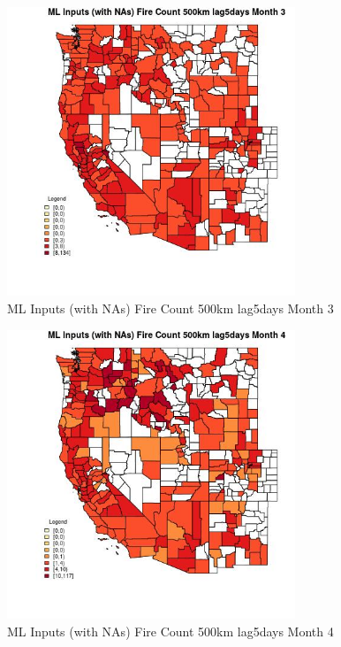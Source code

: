 \begin{figure} 
\centering  
\includegraphics[width=0.77\textwidth]{Code_Outputs/Report_ML_input_PM25_Step4_part_e_de_duplicated_aves_compiled_2019-05-21wNAs_CountyFire_Count_500km_lag5daysmedianMonth3.jpg} 
\caption{\label{fig:Report_ML_input_PM25_Step4_part_e_de_duplicated_aves_compiled_2019-05-21wNAsCountyFire_Count_500km_lag5daysmedianMonth3}ML Inputs (with NAs) Fire Count 500km lag5days Month 3} 
\end{figure} 
 

\begin{figure} 
\centering  
\includegraphics[width=0.77\textwidth]{Code_Outputs/Report_ML_input_PM25_Step4_part_e_de_duplicated_aves_compiled_2019-05-21wNAs_CountyFire_Count_500km_lag5daysmedianMonth4.jpg} 
\caption{\label{fig:Report_ML_input_PM25_Step4_part_e_de_duplicated_aves_compiled_2019-05-21wNAsCountyFire_Count_500km_lag5daysmedianMonth4}ML Inputs (with NAs) Fire Count 500km lag5days Month 4} 
\end{figure} 
 

